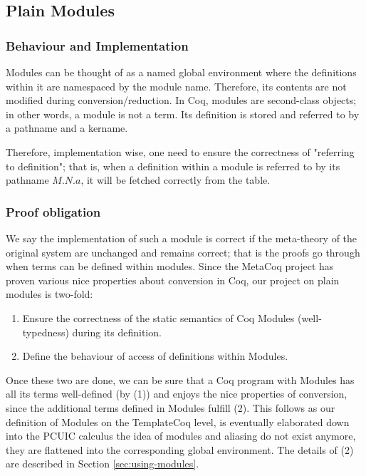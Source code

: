 \subsection{Plain Modules}
\label{sec:plainmodules}

\subsubsection{Behaviour and Implementation}

Modules can be thought of as a named global environment where the definitions
within it are namespaced by the module name. Therefore, its contents are not
modified during conversion/reduction.  In Coq, modules are second-class objects;
in other words, a module is not a term.  Its definition is stored and referred
to by a pathname and a kername.

Therefore, implementation wise, one need to ensure the correctness of "referring
to definition"; that is, when a definition within a module is referred to by its
pathname $M.N.a$, it will be fetched correctly from the table.

\subsubsection{Proof obligation}

We say the implementation of such a module is correct if the meta-theory of the
original system are unchanged and remains correct; that is the proofs go through
when terms can be defined within modules. Since the MetaCoq project has proven
various nice properties about conversion in Coq, our project on plain modules is
two-fold:

\begin{enumerate}
\item Ensure the correctness of the static semantics of Coq Modules
(well-typedness) during its definition.
\item Define the behaviour of access of definitions within Modules.
\end{enumerate}

Once these two are done, we can be sure that a Coq program with Modules
has all its terms well-defined (by (1)) and enjoys the nice properties of
conversion, since the additional terms defined in Modules fulfill (2).
This follows as our definition of Modules on the TemplateCoq level, is
eventually elaborated down into the PCUIC calculus the idea of modules and
aliasing do not exist anymore, they are flattened into the corresponding global
environment. The details of (2) are described in Section \ref{sec:using-modules}.

